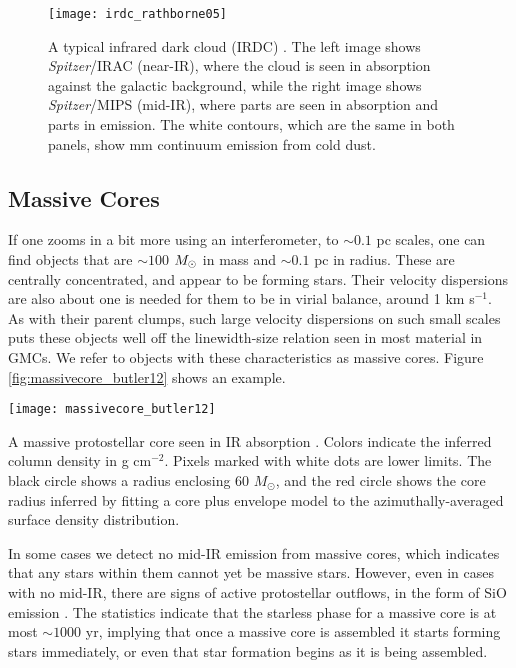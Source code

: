 \begin{figure}
\texttt{[image: irdc\_rathborne05]}
\caption[IR and mm images of an IRDC]{
\label{fig:irdc_rathborne05}
A typical infrared dark cloud (IRDC) \citep{rathborne06a}. The left image shows \textit{Spitzer}/IRAC (near-IR), where the cloud is seen in absorption against the galactic background, while the right image shows \textit{Spitzer}/MIPS (mid-IR), where parts are seen in absorption and parts in emission. The white contours, which are the same in both panels, show mm continuum emission from cold dust.
}
\end{figure}


\subsection{Massive Cores}
\label{ssec:massivecores}

If one zooms in a bit more using an interferometer, to $\sim 0.1$ pc scales, one can find objects that are $\sim 100$ $M_{\odot}$ in mass and $\sim 0.1$ pc in radius. These are centrally concentrated, and appear to be forming stars. Their velocity dispersions are also about one is needed for them to be in virial balance, around 1 km s$^{-1}$. As with their parent clumps, such large velocity dispersions on such small scales puts these objects well off the linewidth-size relation seen in most material in GMCs. We refer to objects with these characteristics as massive cores. Figure \ref{fig:massivecore_butler12} shows an example.
\begin{marginfigure}
\texttt{[image: massivecore\_butler12]}
\caption[A massive core in IR absorption]{
\label{fig:massivecore_butler12}
A massive protostellar core seen in IR absorption \citep{butler12a}. Colors indicate the inferred column density in g cm$^{-2}$. Pixels marked with white dots are lower limits. The black circle shows a radius enclosing $60$ $M_\odot$, and the red circle shows the core radius inferred by fitting a core plus envelope model to the azimuthally-averaged surface density distribution.
}
\end{marginfigure}

In some cases we detect no mid-IR emission from massive cores, which indicates that any stars within them cannot yet be massive stars. However, even in cases with no mid-IR, there are signs of active protostellar outflows, in the form of SiO emission \citep[e.g.,][]{motte07a}. The statistics indicate that the starless phase for a massive core is at most $\sim 1000$ yr, implying that once a massive core is assembled it starts forming stars immediately, or even that star formation begins as it is being assembled.

